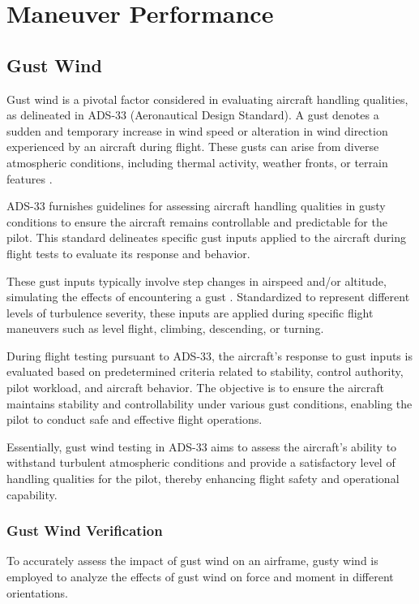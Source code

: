 \chapter{Maneuver Performance}

\section{Gust Wind}

Gust wind is a pivotal factor considered in evaluating aircraft handling qualities, as delineated in ADS-33 (Aeronautical Design Standard). A gust denotes a sudden and temporary increase in wind speed or alteration in wind direction experienced by an aircraft during flight. These gusts can arise from diverse atmospheric conditions, including thermal activity, weather fronts, or terrain features \cite{Wu2019}.

ADS-33 furnishes guidelines for assessing aircraft handling qualities in gusty conditions to ensure the aircraft remains controllable and predictable for the pilot. This standard delineates specific gust inputs applied to the aircraft during flight tests to evaluate its response and behavior.

These gust inputs typically involve step changes in airspeed and/or altitude, simulating the effects of encountering a gust \cite{raza2015autonomous}. Standardized to represent different levels of turbulence severity, these inputs are applied during specific flight maneuvers such as level flight, climbing, descending, or turning.

During flight testing pursuant to ADS-33, the aircraft's response to gust inputs is evaluated based on predetermined criteria related to stability, control authority, pilot workload, and aircraft behavior. The objective is to ensure the aircraft maintains stability and controllability under various gust conditions, enabling the pilot to conduct safe and effective flight operations.

Essentially, gust wind testing in ADS-33 aims to assess the aircraft's ability to withstand turbulent atmospheric conditions and provide a satisfactory level of handling qualities for the pilot, thereby enhancing flight safety and operational capability.

\subsection{Gust Wind Verification}

To accurately assess the impact of gust wind on an airframe, gusty wind is employed to analyze the effects of gust wind on force and moment in different orientations.

